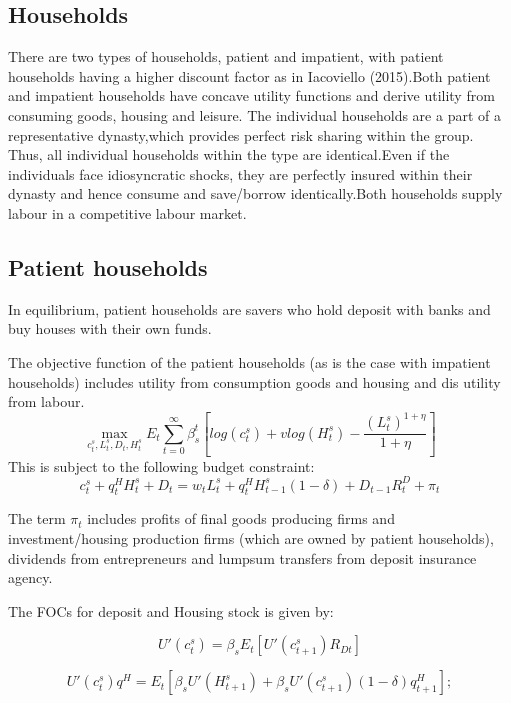 \documentclass[12pt]{article}
\numberwithin{equation}{section}
\begin{document}
\begin{appendix}
\subsection*{Households}

There are two types of households, patient and impatient, with patient households having a higher discount factor as in Iacoviello (2015).Both patient and impatient households have concave utility functions and derive utility from consuming goods, housing and leisure. The individual households are a part of a representative dynasty,which provides perfect risk sharing within the group. Thus, all individual households within the type are identical.Even if the individuals face idiosyncratic shocks, they are perfectly insured within their dynasty and hence consume and save/borrow identically.Both households supply labour in a competitive labour market.

\subsection*{Patient households}
In equilibrium, patient households are savers who hold deposit with banks and buy houses with their own funds. 

The objective function of the patient households (as is the case with impatient households) includes utility from consumption goods and housing and dis utility from labour.
\begin{equation}
\max_{c^s_t,L^s_t,D_{t},H^s_t}E_t\sum _{t=0}^{\infty } \beta_{s}^t [log(c^s_t)+vlog(H^s_t)-\frac{(L^s_t)^{1+\eta}}{1+\eta} ]
\end{equation}
This is subject to the following budget constraint:
\begin{equation}
c^s_t+q^H_{t}H^s_{t} +{D_{t}}=w_{t}L^s_{t}+q^H_{t}H^s_{t-1}(1-\delta)+{D_{t-1}}R^D_{t}+\pi_{t}
\end{equation}

The term $\pi_{t}$ includes profits of final goods producing firms and investment/housing production firms (which are owned by patient households), dividends from entrepreneurs and lumpsum transfers from deposit insurance agency. 

The FOCs for deposit and Housing stock is given by:

\begin{equation}
U'(c^{s}_{t}) = \beta_sE_t[ U'(c^{s}_{t+1})R_{Dt}]
\end{equation}

\begin{equation}
U'(c^{s}_{t})q^H = E_t[\beta_sU'(H^{s}_{t+1}) + \beta_sU'(c^{s}_{t+1})(1-\delta)q^H_{t+1}];
\end{equation}


\end{appendix}
\end{document}

